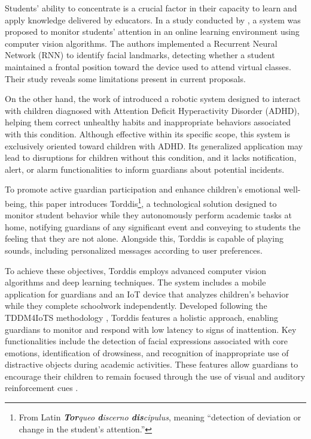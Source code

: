 Students' ability to concentrate is a crucial factor in their capacity to learn and apply knowledge delivered by educators. In a study conducted by \cite{Terraza2022}, a system was proposed to monitor students’ attention in an online learning environment using computer vision algorithms. The authors implemented a Recurrent Neural Network (RNN) to identify facial landmarks, detecting whether a student maintained a frontal position toward the device used to attend virtual classes. Their study reveals some limitations present in current proposals.

On the other hand, the work of \cite{Berrezueta-Guzman2021} introduced a robotic system designed to interact with children diagnosed with Attention Deficit Hyperactivity Disorder (ADHD), helping them correct unhealthy habits and inappropriate behaviors associated with this condition. Although effective within its specific scope, this system is exclusively oriented toward children with ADHD. Its generalized application may lead to disruptions for children without this condition, and it lacks notification, alert, or alarm functionalities to inform guardians about potential incidents.

To promote active guardian participation and enhance children’s emotional well-being, this paper introduces Torddis\footnote{From Latin \textit{\textbf{Tor}queo \textbf{d}iscerno \textbf{dis}cipulus}, meaning ``detection of deviation or change in the student’s attention.''}, a technological solution designed to monitor student behavior while they autonomously perform academic tasks at home, notifying guardians of any significant event and conveying to students the feeling that they are not alone. Alongside this, Torddis is capable of playing sounds, including personalized messages according to user preferences.

To achieve these objectives, Torddis employs advanced computer vision algorithms and deep learning techniques. The system includes a mobile application for guardians and an IoT device that analyzes children's behavior while they complete schoolwork independently. Developed following the TDDM4IoTS methodology \citep{Guerrero-Ulloa2020TDDM4IoTS}, Torddis features a holistic approach, enabling guardians to monitor and respond with low latency to signs of inattention. Key functionalities include the detection of facial expressions associated with core emotions, identification of drowsiness, and recognition of inappropriate use of distractive objects during academic activities. These features allow guardians to encourage their children to remain focused through the use of visual and auditory reinforcement cues \citep{Al-Gburi2023,Enadula2021,Terraza2022}.

